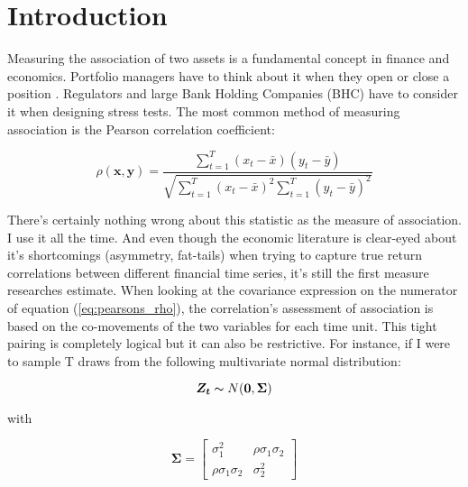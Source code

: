 \documentclass[12pt]{article}
\begin{document}
\section{Introduction}

Measuring the association of two assets is a fundamental concept in finance and economics. Portfolio managers have to think about it when they open or close a position \cite{Markowitz1952PortfolioSelection, sharpe1963simplified}. Regulators and large Bank Holding Companies (BHC) have to consider it when designing stress tests. The most common method of measuring association is the Pearson correlation coefficient:

\begin{equation} \label{eq:pearsons_rho}
\rho(\boldsymbol{x}, \boldsymbol{y}) = \frac{ \sum_{t=1}^{T} (x_{t} - \bar{x}) (y_{t} - \bar{y})}{ \sqrt{\sum_{t=1}^{T} (x_{t} - \bar{x})^{2} \sum_{t=1}^{T} (y_{t} - \bar{y})^{2}}}
\end{equation}

There's certainly nothing wrong about this statistic as the measure of association. I use it all the time. And even though the economic literature is clear-eyed about it's shortcomings (asymmetry, fat-tails) when trying to capture true return correlations between different financial time series, it's still the first measure researches estimate. When looking at the covariance expression on the numerator of equation (\ref{eq:pearsons_rho}), the correlation's assessment of association is based on the co-movements of the two variables for each time unit. This tight pairing is completely logical but it can also be restrictive. For instance, if I were to sample T draws from the following multivariate normal distribution:

\begin{equation}
    \boldsymbol{Z_{t}} \thicksim N(\boldsymbol{0}, \boldsymbol{\Sigma})
\end{equation}

with 

\begin{equation}
    \boldsymbol{\Sigma} = \begin{bmatrix}
        \sigma_{1}^{2}             & \rho \sigma_{1}\sigma_{2} \\
        \rho \sigma_{1} \sigma_{2} & \sigma_{2}^{2} 
    \end{bmatrix}
\end{equation}
\end{document}
